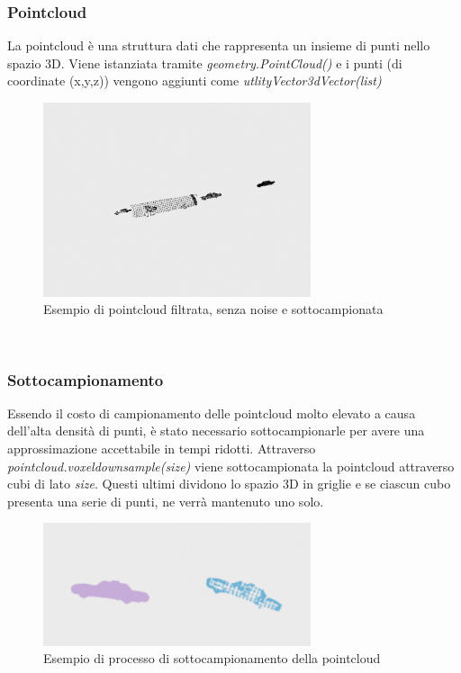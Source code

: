 \documentclass[italian]{article}
\begin{document}
\subsubsection{Pointcloud}
La pointcloud è una struttura dati che rappresenta un insieme di punti nello spazio 3D. Viene istanziata tramite \textit{geometry.PointCloud()} e i punti (di coordinate (x,y,z)) vengono aggiunti come \textit{utlityVector3dVector(list)}\\
\begin{figure}[H]
	\centering
	\includegraphics[width=0.7\textwidth]{Pointcloud}
	\footnotesize
	\caption{Esempio di pointcloud filtrata, senza noise e sottocampionata}
\end{figure}\\
\subsubsection{Sottocampionamento}
Essendo il costo di campionamento delle pointcloud molto elevato a causa dell'alta densità di punti, è stato necessario sottocampionarle per avere una approssimazione accettabile in tempi ridotti. Attraverso \textit{pointcloud.voxeldownsample(size)}  viene sottocampionata la pointcloud attraverso cubi di lato \textit{size}. Questi ultimi dividono lo spazio 3D in griglie e se ciascun cubo presenta una serie di punti, ne verrà mantenuto uno solo.
\begin{figure}[H]
	\centering
	\includegraphics[width=0.7\textwidth]{Voxel}
	\footnotesize
	\caption{Esempio di processo di sottocampionamento della pointcloud}
\end{figure}
\end{document}
